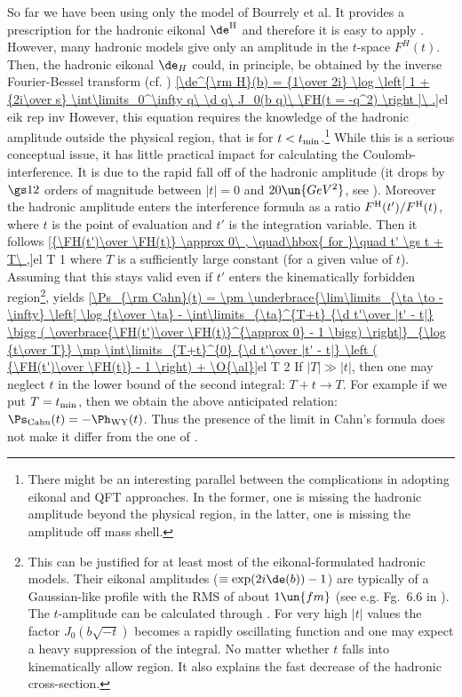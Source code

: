 

So far we have been using only the model of Bourrely et al. It provides a prescription for the hadronic eikonal $\de^{\rm H}$ and therefore it is easy to apply . However, many hadronic models give only an amplitude in the $t$-space $F^H(t)$. Then, the hadronic eikonal $\de_H$ could, in principle, be obtained by the inverse Fourier-Bessel transform (cf. )
\eqref{\de^{\rm H}(b) = {1\over 2i} \log \left[ 1 + {2i\over s} \int\limits_0^\infty q\ \d q\ J_0(b q)\ \FH(t = -q^2)  \right ]\ .}{el eik rep inv}
However, this equation requires the knowledge of the hadronic amplitude outside the physical region, that is for $t < t_{\rm min}$.\footnote{%
There might be an interesting parallel between the complications in adopting eikonal and QFT approaches. In the former, one is missing the hadronic amplitude beyond the physical region, in the latter, one is missing the amplitude off mass shell.}
While this is a serious conceptual issue, it has little practical impact for calculating the Coulomb-interference. It is due to the rapid fall off of the hadronic amplitude (it drops by $\gs 12$ orders of magnitude between $|t|=0$ and $20\un{GeV^2}$, see ). Moreover the hadronic amplitude enters the interference formula  as a ratio $F^{\rm H}(t') / F^{\rm H}(t)$, where $t$ is the point of evaluation and $t'$ is the integration variable. Then it follows
\eqref{{\FH(t')\over \FH(t)} \approx 0\ , \quad\hbox{ for }\quad t' \gs t + T\ ,}{el T 1}
where $T$ is a sufficiently large constant (for a given value of $t$). Assuming that this stays valid even if $t'$ enters the kinematically forbidden region\footnote{%
This can be justified for at least most of the eikonal-formulated hadronic models. Their eikonal amplitudes ($\equiv \exp(2i\de(b)) - 1$) are typically of a Gaussian-like profile with the RMS of about $1\un{fm}$ (see e.g. Fg.~6.6 in ). The $t$-amplitude can be calculated through . For very high $|t|$ values the factor $J_0(b\sqrt{-t})$ becomes a rapidly oscillating function and one may expect a heavy suppression of the integral. No matter whether $t$ falls into kinematically allow region. It also explains the fast decrease of the hadronic cross-section. 
},  yields
\eqref{\Ps_{\rm Cahn}(t) =
\pm \underbrace{\lim\limits_{\ta \to -\infty} \left[
	\log {t\over \ta}
	- \int\limits_{\ta}^{T+t} {\d t'\over |t' - t|} \bigg ( \overbrace{\FH(t')\over \FH(t)}^{\approx 0} - 1 \bigg)
\right]}_{\log {t\over T}}
\mp \int\limits_{T+t}^{0} {\d t'\over |t' - t|} \left ( {\FH(t')\over \FH(t)} - 1 \right)
+ \O{\al}}{el T 2}
If $|T| \gg |t|$, then one may neglect $t$ in the lower bound of the second integral: $T+t\rightarrow T$. For example if we put $T=t_{\rm min}$, then we obtain the above anticipated relation: $\Ps_{\rm Cahn}(t) = - \Ph_{\rm WY}(t)$. Thus the presence of the limit in Cahn's formula does not make it differ from the one of \WaY.

